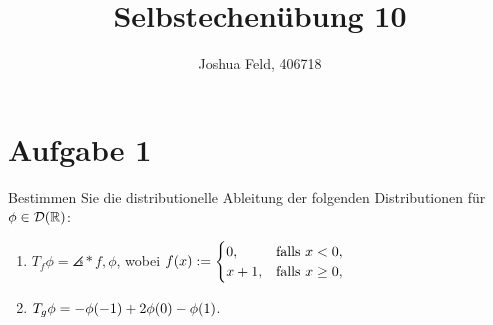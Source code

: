 \documentclass{exercise}
\institute{Applied and Computational Mathematics}
\title{Selbstechenübung 10}
\author{Joshua Feld, 406718}
\begin{document}
    \maketitle


    \section*{Aufgabe 1}
    
    \begin{problem}
        Bestimmen Sie die distributionelle Ableitung der folgenden Distributionen für \(\phi \in \mathcal{D}\parentheses*{\R}\):
        \begin{enumerate}
            \item \(T_f \phi = \angles*{f, \phi}\), wobei \(f\parentheses*{x} := \begin{cases}
                0, & \text{falls }x < 0,\\
                x + 1, & \text{falls }x \ge 0,
            \end{cases}\)
            \item \(T_g \phi = -\phi\parentheses*{-1} + 2\phi\parentheses*{0} - \phi\parentheses*{1}\).
        \end{enumerate}
    \end{problem}
    
\end{document}
